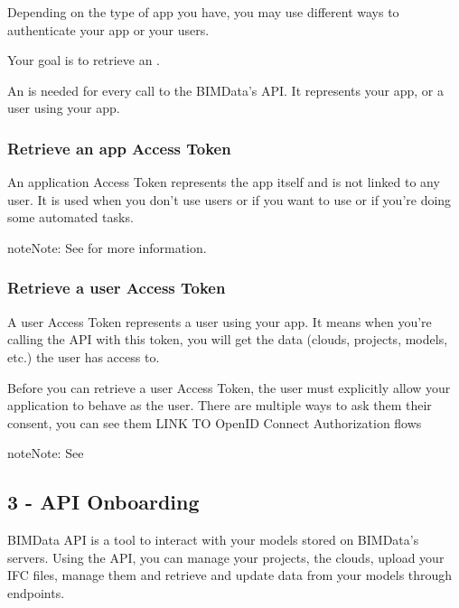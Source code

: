 \documentclass[a4paper,12pt,english]{sphinxmanual}
\begin{document}
Depending on the type of app you have, you may use different ways to authenticate your app or your users.

Your goal is to retrieve an .

An  is needed for every call to the BIMData’s API.
It represents your app, or a user using your app.


\subsubsection{Retrieve an app Access Token}
\label{\detokenize{tutorials/guided_tour:retrieve-an-app-access-token}}
An application Access Token represents the app itself and is not linked to any user.
It is used when you don’t use  users or if you want to use   or if you’re doing some automated tasks.

\begin{sphinxadmonition}{note}{Note:}
See  for more information.
\end{sphinxadmonition}


\subsubsection{Retrieve a user Access Token}
\label{\detokenize{tutorials/guided_tour:retrieve-a-user-access-token}}
A user Access Token represents a user using your app.
It means when you’re calling the API with this token, you will get the data (clouds, projects, models, etc.) the user has access to.

Before you can retrieve a user Access Token, the user must explicitly allow your application to behave as the user.
There are multiple ways to ask them their consent, you can see them LINK TO OpenID Connect Authorization flows

\begin{sphinxadmonition}{note}{Note:}
See 
\end{sphinxadmonition}


\subsection{3 - API Onboarding}
\label{\detokenize{tutorials/guided_tour:api-onboarding}}\label{\detokenize{tutorials/guided_tour:api-onboarding-cloud}}
BIMData API is a tool to interact with your models stored on BIMData’s servers.
Using the API, you can manage your projects, the clouds, upload your IFC files, manage them and retrieve and update data from your models through endpoints.
\end{document}
